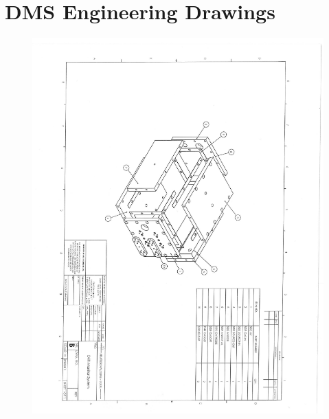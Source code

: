 \chapter{DMS Engineering Drawings}
\label{apdx:A}

\begin{figure}[h!]
	\centering
	\includegraphics[width=0.9\linewidth]{figures/dms/DMS_drawings_01.pdf}
\end{figure}

